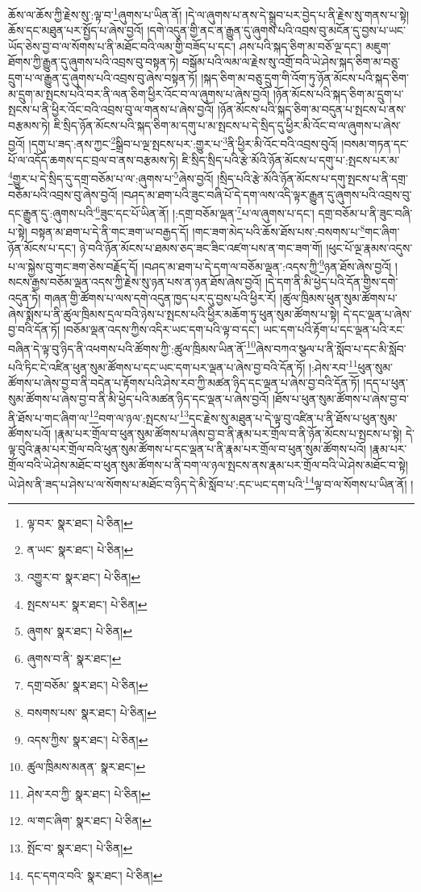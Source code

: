 ཆོས་ལ་ཆོས་ཀྱི་རྗེས་སུ་:ལྟ་བ་\footnote{ལྟ་བར་  སྣར་ཐང་།  པེ་ཅིན། }ཞུགས་པ་ཡིན་ནོ། །དེ་ལ་ཞུགས་པ་ནས་དེ་སྒྲུབ་པར་བྱེད་པ་ནི་རྗེས་སུ་གནས་པ་སྟེ། ཆོས་དང་མཐུན་པར་སྤྱོད་པ་ཞེས་བྱའོ། །དགེ་འདུན་གྱི་ནང་ན་རྒྱུན་དུ་ཞུགས་པའི་འབྲས་བུ་མངོན་དུ་བྱས་པ་ཡང་ཡོད་ཅེས་བྱ་བ་ལ་སོགས་པ་ནི་མཐོང་བའི་ལམ་གྱི་བཟོད་པ་དང་། ཤས་པའི་སྐད་ཅིག་མ་བཅོ་ལྔ་དང་། མཇུག་ཐོགས་ཀྱི་རྒྱུན་དུ་ཞུགས་པའི་འབྲས་བུ་བསྟན་ཏེ། བསྒོམ་པའི་ལམ་ལ་རྗེས་སུ་འགྲོ་བའི་ཡེ་ཤེས་སྐད་ཅིག་མ་བཅུ་དྲུག་པ་ལ་རྒྱུན་དུ་ཞུགས་པའི་འབྲས་བུ་ཞེས་བསྟན་ཏོ། །སྐད་ཅིག་མ་བཅུ་དྲུག་གི་འོག་ཏུ་ཉོན་མོངས་པའི་སྐད་ཅིག་མ་དྲུག་མ་སྤངས་པའི་བར་ནི་ལན་ཅིག་ཕྱིར་འོང་བ་ལ་ཞུགས་པ་ཞེས་བྱའོ། །ཉོན་མོངས་པའི་སྐད་ཅིག་མ་དྲུག་པ་སྤངས་པ་ནི་ཕྱིར་འོང་བའི་འབྲས་བུ་ལ་གནས་པ་ཞེས་བྱའོ། །ཉོན་མོངས་པའི་སྐད་ཅིག་མ་བདུན་པ་སྤངས་པ་ནས་བརྩམས་ཏེ། ཇི་སྲིད་ཉོན་མོངས་པའི་སྐད་ཅིག་མ་དགུ་པ་མ་སྤངས་པ་དེ་སྲིད་དུ་ཕྱིར་མི་འོང་བ་ལ་ཞུགས་པ་ཞེས་བྱའོ། །དགུ་པ་ཟད་:ནས་ཀྱང་\footnote{ན་ཡང་  སྣར་ཐང་།  པེ་ཅིན། }སྒྲིབ་པ་ལྔ་སྤངས་པར་:གྱུར་པ་\footnote{འགྱུར་བ་  སྣར་ཐང་།  པེ་ཅིན། }ནི་ཕྱིར་མི་འོང་བའི་འབྲས་བུའོ། །བསམ་གཏན་དང་པོ་ལ་འདོད་ཆགས་དང་བྲལ་བ་ནས་བརྩམས་ཏེ། ཇི་སྲིད་སྲིད་པའི་རྩེ་མོའི་ཉོན་མོངས་པ་དགུ་པ་:སྤངས་པར་མ་\footnote{སྤངས་པར་  སྣར་ཐང་།  པེ་ཅིན། }གྱུར་པ་དེ་སྲིད་དུ་དགྲ་བཅོམ་པ་ལ་:ཞུགས་པ་\footnote{ཞུགས་  སྣར་ཐང་།  པེ་ཅིན། }ཞེས་བྱའོ། །སྲིད་པའི་རྩེ་མོའི་ཉོན་མོངས་པ་དགུ་སྤངས་པ་ནི་དགྲ་བཅོམ་པའི་འབྲས་བུ་ཞེས་བྱའོ། །བཤད་མ་ཐག་པའི་ཟུང་བཞི་པོ་དེ་དག་ལས་འདི་ལྟར་རྒྱུན་དུ་ཞུགས་པའི་འབྲས་བུ་དང་རྒྱུན་དུ་:ཞུགས་པའི་\footnote{ཞུགས་བ་ནི་  སྣར་ཐང་། }ཟུང་དང་པོ་ཡིན་ནོ། །:དགྲ་བཅོམ་ལྡན་\footnote{དགྲ་བཅོམ་  སྣར་ཐང་།  པེ་ཅིན། }པ་ལ་ཞུགས་པ་དང་། དགྲ་བཅོམ་པ་ནི་ཟུང་བཞི་པ་སྟེ། བསྟན་མ་ཐག་པ་དེ་ནི་གང་ཟག་ཡ་བརྒྱད་དོ། །གང་ཟག་མེད་པའི་ཆོས་ཐོས་པས་:བསགས་པ་\footnote{བསགས་པས་  སྣར་ཐང་།  པེ་ཅིན། }གང་ཞིག་ཉོན་མོངས་པ་དང་། ཉེ་བའི་ཉོན་མོངས་པ་ཐམས་ཅད་ཟང་ཟིང་འཛག་པས་ན་གང་ཟག་གོ། །ཕུང་པོ་ལྔ་རྣམས་འདུས་པ་ལ་སྐྱེས་བུ་གང་ཟག་ཅེས་བརྗོད་དོ། །བཤད་མ་ཐག་པ་དེ་དག་ལ་བཅོམ་ལྡན་:འདས་ཀྱི་\footnote{འདས་ཀྱིས་  སྣར་ཐང་།  པེ་ཅིན། }ཉན་ཐོས་ཞེས་བྱའོ། །སངས་རྒྱས་བཅོམ་ལྡན་འདས་ཀྱི་རྗེས་སུ་ཉན་པས་ན་ཉན་ཐོས་ཞེས་བྱའོ། །དེ་དག་ནི་མི་ཕྱེད་པའི་དོན་གྱིས་དགེ་འདུན་ཏེ། གཞན་གྱི་ཚོགས་པ་ལས་དགེ་འདུན་ཁྱད་པར་དུ་བྱས་པའི་ཕྱིར་རོ། །ཚུལ་ཁྲིམས་ཕུན་སུམ་ཚོགས་པ་ཞེས་སྨོས་པ་ནི་ཚུལ་ཁྲིམས་དྲལ་བའི་ཉེས་པ་སྤངས་པའི་ཕྱིར་མཆོག་ཏུ་ཕུན་སུམ་ཚོགས་པ་སྟེ། དེ་དང་ལྡན་པ་ཞེས་བྱ་བའི་དོན་ཏོ། །བཅོམ་ལྡན་འདས་ཀྱིས་འདིར་ཡང་དག་པའི་ལྟ་བ་དང་། ཡང་དག་པའི་རྟོག་པ་དང་ལྡན་པའི་རང་བཞིན་དེ་ལྟ་བུ་ཉིད་ནི་འཕགས་པའི་ཚོགས་ཀྱི་:ཚུལ་ཁྲིམས་ཡིན་ནོ་\footnote{ཚུལ་ཁྲིམས་མནན་  སྣར་ཐང་། }ཞེས་བཀའ་སྩལ་པ་ནི་སློབ་པ་དང་མི་སློབ་པའི་ཏིང་ངེ་འཛིན་ཕུན་སུམ་ཚོགས་པ་དང་ཡང་དག་པར་ལྡན་པ་ཞེས་བྱ་བའི་དོན་ཏོ། །:ཤེས་རབ་\footnote{ཤེས་རབ་ཀྱི་  སྣར་ཐང་།  པེ་ཅིན། }ཕུན་སུམ་ཚོགས་པ་ཞེས་བྱ་བ་ནི་བདེན་པ་རྟོགས་པའི་ཤེས་རབ་ཀྱི་མཚན་ཉིད་དང་ལྡན་པ་ཞེས་བྱ་བའི་དོན་ཏོ། །དད་པ་ཕུན་སུམ་ཚོགས་པ་ཞེས་བྱ་བ་ནི་མི་ཕྱེད་པའི་མཚན་ཉིད་དང་ལྡན་པ་ཞེས་བྱའོ། །ཐོས་པ་ཕུན་སུམ་ཚོགས་པ་ཞེས་བྱ་བ་ནི་ཐོས་པ་གང་ཞིག་ལ་\footnote{ལ་གང་ཞིག་  སྣར་ཐང་།  པེ་ཅིན། }བག་ལ་ཉལ་:སྤངས་པ་\footnote{སྤོང་བ་  སྣར་ཐང་།  པེ་ཅིན། }དང་རྗེས་སུ་མཐུན་པ་དེ་ལྟ་བུ་འཛིན་པ་ནི་ཐོས་པ་ཕུན་སུམ་ཚོགས་པའོ། །རྣམ་པར་གྲོལ་བ་ཕུན་སུམ་ཚོགས་པ་ཞེས་བྱ་བ་ནི་རྣམ་པར་གྲོལ་བ་ནི་ཉོན་མོངས་པ་སྤངས་པ་སྟེ། དེ་ལྟ་བུའི་རྣམ་པར་གྲོལ་བའི་ཕུན་སུམ་ཚོགས་པ་དང་ལྡན་པ་ནི་རྣམ་པར་གྲོལ་བ་ཕུན་སུམ་ཚོགས་པའོ། །རྣམ་པར་གྲོལ་བའི་ཡེ་ཤེས་མཐོང་བ་ཕུན་སུམ་ཚོགས་པ་ནི་བག་ལ་ཉལ་སྤངས་ནས་རྣམ་པར་གྲོལ་བའི་ཡེ་ཤེས་མཐོང་བ་སྟེ། ཡེ་ཤེས་ནི་ཟད་པ་ཤེས་པ་ལ་སོགས་པ་མཐོང་བ་ཉིད་དེ་མི་སློབ་པ་:དང་ཡང་དག་པའི་\footnote{དང་དགའ་བའི་  སྣར་ཐང་།  པེ་ཅིན། }ལྟ་བ་ལ་སོགས་པ་ཡིན་ནོ། །
